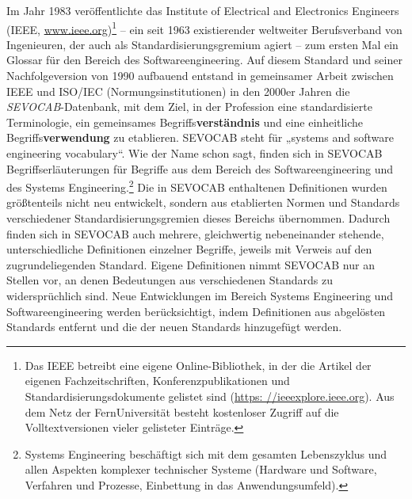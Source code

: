 \label{text:Sevocab}
Im Jahr 1983 veröffentlichte das Institute of Electrical and Electronics Engineers (IEEE, \href{https://www.ieee.org/}{www.ieee.org})\footnote{Das IEEE betreibt eine eigene Online-Bibliothek, in der die Artikel der eigenen Fachzeitschriften, Konferenzpublikationen und Standardisierungsdokumente gelistet sind (\href{https://ieeexplore.ieee.org}{https:
		\linebreak %
		//ieeexplore.ieee.org}). Aus dem Netz der FernUniversität besteht kostenloser Zugriff auf die Volltextversionen vieler gelisteter Einträge.} -- ein seit 1963 existierender weltweiter Berufsverband von Ingenieuren, der auch als Standardisierungsgremium agiert -- zum ersten Mal ein Glossar für den Bereich des Softwareengineering. Auf diesem Standard und seiner Nachfolgeversion von 1990 aufbauend entstand in gemeinsamer Arbeit zwischen IEEE und ISO/IEC (Normungsinstitutionen) in den 2000er Jahren die
\textit{SEVOCAB}-Datenbank, mit dem Ziel, in der Profession eine standardisierte Terminologie, ein gemeinsames Begriffs\textbf{verständnis} und eine einheitliche Begriffs\textbf{verwendung} zu etablieren. SEVOCAB steht für „systems and software engineering vocabulary“. Wie der Name schon sagt, finden sich in SEVOCAB Begriffserläuterungen für Begriffe aus dem Bereich des Softwareengineering und des Systems Engineering.\footnote{Systems Engineering beschäftigt sich mit dem gesamten Lebenszyklus und allen Aspekten komplexer technischer Systeme (Hardware und Software, Verfahren und Prozesse, Einbettung in das Anwendungsumfeld).} Die in SEVOCAB enthaltenen Definitionen wurden größtenteils nicht neu entwickelt, sondern aus etablierten Normen und Standards verschiedener Standardisierungs\-gremien dieses Bereichs übernommen. Dadurch finden sich in SEVOCAB auch mehrere, gleichwertig nebeneinander stehende, unterschiedliche Definitionen einzelner Begriffe, jeweils mit Verweis auf den zugrundeliegenden Standard. Eigene Defini\-tionen nimmt SEVOCAB nur an Stellen vor, an denen Bedeutungen aus verschiedenen Standards zu widersprüchlich sind. Neue Entwicklungen im Bereich Systems Engineering und Softwareengineering werden berücksichtigt, indem Definitionen aus abgelösten Standards entfernt und die der neuen Standards hinzugefügt werden. 



